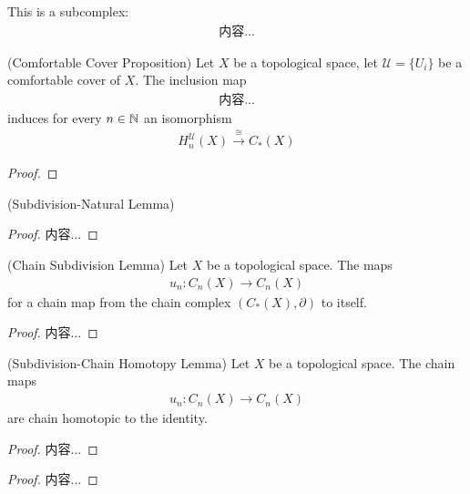 \documentclass[Total.tex]{subfiles}
\begin{document}
				This is a subcomplex:
				\begin{gather*}
					内容...
				\end{gather*}
				\begin{proposition}
					(Comfortable Cover Proposition) Let $X$ be a topological space, let $\mathcal{U}=\{U_i\}$ be a comfortable cover of $X$. The inclusion map
					\begin{gather*}
						内容...
					\end{gather*}
					induces for every $n\in \mathbb{N}$ an isomorphism
					\begin{gather*}
						H_n^\mathcal{U}(X)\stackrel{\cong}{\rightarrow} C_*(X)
					\end{gather*}
				\end{proposition}
				\begin{proof}
					
				\end{proof}
				\begin{proposition}
					(Subdivision-Natural Lemma)
				\end{proposition}
				\begin{proof}
					内容...
				\end{proof}
				
				\begin{lemma}
					(Chain Subdivision Lemma) Let $X$ be a topological space. The maps
					\begin{gather*}
						u_n:C_n(X)\rightarrow C_n(X)
					\end{gather*}
					for a chain map from the chain complex $(C_*(X),\partial)$ to itself.
				\end{lemma}
				\begin{proof}
					内容...
				\end{proof}
				\begin{lemma}
					(Subdivision-Chain Homotopy Lemma) Let $X$ be a topological space. The chain maps
					\begin{gather*}
						u_n:C_n(X)\rightarrow C_n(X)
					\end{gather*}
					are chain homotopic to the identity.
				\end{lemma}
				\begin{proof}
					内容...
				\end{proof}
				\begin{proof}
					内容...
				\end{proof}
				
\end{document}
